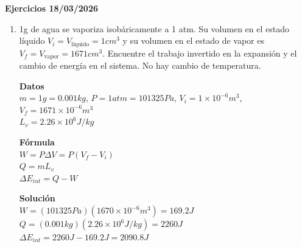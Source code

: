 \documentclass[a4paper, 11pt]{article}
\newcommand{\Pspace}{0.5cm}
\newcommand{\Aspace}{0.2cm}
\begin{document}
    \newpage
    {\Large \textbf{Ejercicios 18/03/2026}}
    \begin{enumerate}
    \vspace{\Pspace}
    \item 1g de agua se vaporiza isobáricamente a 1 atm. Su volumen en el estado líquido $V_{i} = V_{\text{líquido}} = 1cm^{3}$ y su volumen en el estado de vapor es $V_{f} = V_{\text{vapor}} = 1671cm^{3}$. Encuentre el trabajo invertido en la expansión y el cambio de energía en el sistema. No hay cambio de temperatura. \par
        \vspace{\Aspace} \par
        { \color{azul} 
            \textbf{Datos} \\
            $m = 1g = 0.001kg$, $P = 1 atm = 101325 Pa$, $V_i = 1 \times 10^{-6} m^3$, $V_f = 1671 \times 10^{-6} m^3$ \\
            $L_v = 2.26 \times 10^6 J/kg$ \par

            \textbf{Fórmula} \\
            $W = P \Delta V = P(V_f - V_i)$ \\
            $Q = m L_v$ \\
            $\Delta E_{int} = Q - W$ \par

            \textbf{Solución} \\
            $W = (101325 Pa)(1670 \times 10^{-6} m^3) = 169.2 J$ \\
            $Q = (0.001 kg)(2.26 \times 10^6 J/kg) = 2260 J$ \\
            $\Delta E_{int} = 2260 J - 169.2 J = 2090.8 J$
        }




\end{enumerate}
\end{document}
